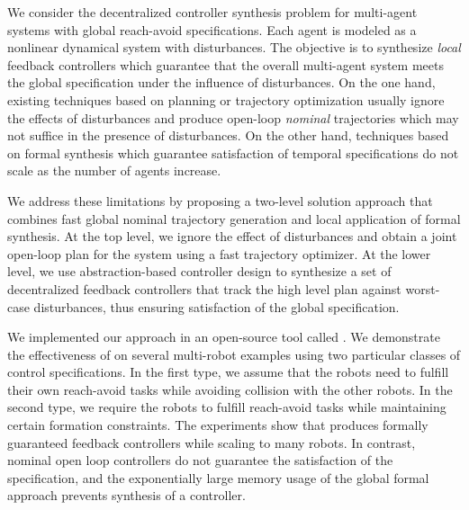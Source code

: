 
We consider the decentralized controller synthesis problem for multi-agent systems with global reach-avoid specifications.
Each agent is modeled as a nonlinear dynamical system with disturbances. The objective is to synthesize \emph{local} feedback controllers which guarantee that the overall multi-agent system meets the global specification under the influence of disturbances.
%
On the one hand, existing techniques based on planning or trajectory optimization usually ignore the effects of disturbances and produce open-loop
\emph{nominal} trajectories which may not suffice in the presence of disturbances.
On the other hand, techniques based on formal synthesis which guarantee satisfaction of temporal specifications do not scale as the number of agents increase.

We address these limitations by proposing a two-level solution approach that combines fast global nominal trajectory generation and local application of formal synthesis.
At the top level, we ignore the effect of disturbances and obtain a joint open-loop plan for the system using a fast trajectory optimizer.
At the lower level, we use abstraction-based controller design to synthesize a set of decentralized feedback controllers 
that track the high level plan against worst-case disturbances, thus ensuring satisfaction of the global specification.

We implemented our approach in an open-source tool called \tool.
We demonstrate the effectiveness of \tool on several multi-robot examples using two particular classes of control specifications.
In the first type, we assume that the robots need to fulfill their own reach-avoid tasks while avoiding collision with the other robots.
In the second type, we require the robots to fulfill reach-avoid tasks while maintaining certain formation constraints.
The experiments show that \tool produces formally guaranteed feedback controllers while scaling to many robots.
In contrast, nominal open loop controllers do not guarantee the satisfaction of the specification, and the exponentially large memory usage of the global formal approach prevents synthesis of a controller.
